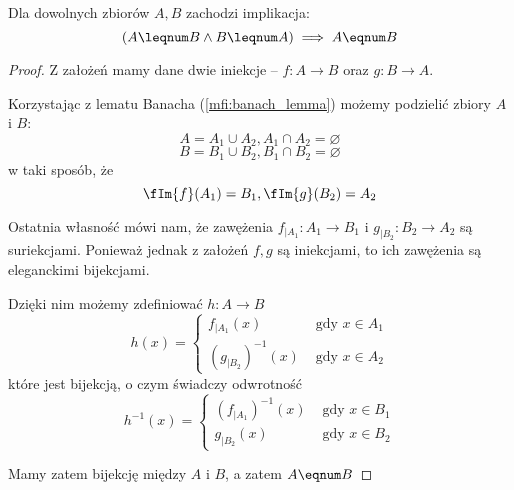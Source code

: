 \begin{theorem}
Dla dowolnych zbiorów \( A, B \) zachodzi implikacja:
    \[
        (A \leqnum B \land B \leqnum A) \implies A \eqnum B
    \]
\end{theorem}
\begin{proof}
    Z założeń mamy dane dwie iniekcje -- \( f: A \rightarrow B \) oraz \( g: B \rightarrow A \).
    
    Korzystając z lematu Banacha (\ref{mfi:banach_lemma}) możemy podzielić zbiory \(A\) i \(B\):
    \[
        A = A_1 \cup A_2, A_1 \cap A_2 = \varnothing
    \]
    \[
        B = B_1 \cup B_2, B_1 \cap B_2 = \varnothing
    \]
    w taki sposób, że 
    \[
        \fIm{f}(A_1) = B_1, \fIm{g}(B_2) = A_2
    \]
    
    Ostatnia własność mówi nam, że zawężenia \( f_{\mid A_1} : A_1 \rightarrow B_1 \) i  \( g_{\mid B_2} : B_2 \rightarrow A_2 \) są suriekcjami.
    Ponieważ jednak z założeń \( f, g \) są iniekcjami, to ich zawężenia są eleganckimi bijekcjami.
    
    Dzięki nim możemy zdefiniować \( h: A \rightarrow B \)
    \[
        h(x) = \begin{cases}
        f_{\mid A_1}(x) & \text{ gdy } x \in A_1 \\
        (g_{\mid B_2})^{-1}(x) & \text{ gdy } x \in A_2
        \end{cases}
    \]
    które jest bijekcją, o czym świadczy odwrotność
    \[
        h^{-1}(x) = \begin{cases}
        (f_{\mid A_1})^{-1}(x) & \text{ gdy } x \in B_1 \\
        g_{\mid B_2}(x) & \text{ gdy } x \in B_2
        \end{cases}
    \]
    
    Mamy zatem bijekcję między \( A \) i \( B \), a zatem \( A \eqnum B \)
    
    
\end{proof}
